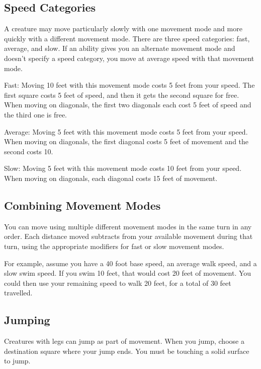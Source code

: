   \subsection{Speed Categories}\label{Speed Categories}
    A creature may move particularly slowly with one movement mode and more quickly with a different movement mode.
    There are three speed categories: fast, average, and slow.
    If an ability gives you an alternate movement mode and doesn't specify a speed category, you move at average speed with that movement mode.
    \begin{raggeditemize}
      \item Fast: Moving 10 feet with this movement mode costs 5 feet from your speed.
        The first square costs 5 feet of speed, and then it gets the second square for free.
        When moving on diagonals, the first two diagonals each cost 5 feet of speed and the third one is free.
      \item Average: Moving 5 feet with this movement mode costs 5 feet from your speed.
        When moving on diagonals, the first diagonal costs 5 feet of movement and the second costs 10.
      \item Slow: Moving 5 feet with this movement mode costs 10 feet from your speed.
        When moving on diagonals, each diagonal costs 15 feet of movement.
    \end{raggeditemize}

  \subsection{Combining Movement Modes}
    You can move using multiple different movement modes in the same turn in any order.
    Each distance moved subtracts from your available movement during that turn, using the appropriate modifiers for fast or slow movement modes.

    For example, assume you have a 40 foot base speed, an average walk speed, and a slow swim speed.
    If you swim 10 feet, that would cost 20 feet of movement.
    You could then use your remaining speed to walk 20 feet, for a total of 30 feet travelled.

  \subsection{Jumping}\label{Jumping}
    Creatures with legs can jump as part of movement.
    When you jump, choose a destination square where your jump ends.
    You must be touching a solid surface to jump.

